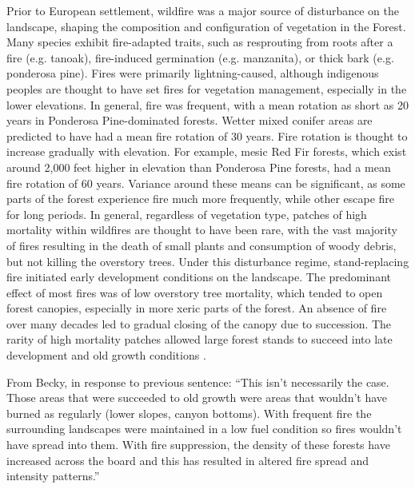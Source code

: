 Prior to European settlement, wildfire was a major source of disturbance on the landscape, shaping the composition and configuration of vegetation in the Forest. Many species exhibit fire-adapted traits, such as resprouting from roots after a fire (e.g. tanoak), fire-induced germination (e.g. manzanita), or thick bark (e.g. ponderosa pine). Fires were primarily lightning-caused, although indigenous peoples are thought to have set fires for vegetation management, especially in the lower elevations. In general, fire was frequent, with a mean rotation as short as 20 years in Ponderosa Pine-dominated forests. Wetter mixed conifer areas are predicted to have had a mean fire rotation of 30 years. Fire rotation is thought to increase gradually with elevation. For example, mesic Red Fir forests, which exist around 2,000 feet higher in elevation than Ponderosa Pine forests, had a mean fire rotation of 60 years. Variance around these means can be significant, as some parts of the forest experience fire much more frequently, while other escape fire for long periods. In general, regardless of vegetation type, patches of high mortality within wildfires are thought to have been rare, with the vast majority of fires resulting in the death of small plants and consumption of woody debris, but not killing the overstory trees. Under this disturbance regime, stand-replacing fire initiated early development conditions on the landscape. The predominant effect of most fires was of low overstory tree mortality, which tended to open forest canopies, especially in more xeric parts of the forest. An absence of fire over many decades led to gradual closing of the canopy due to succession. The rarity of high mortality patches allowed large forest stands to succeed into late development and old growth conditions \citep{SNEP1996,Mallek2013,Safford2014,SNEP1996a}.

From Becky, in response to previous sentence: ``This isn't necessarily the case.  Those areas that were succeeded to old growth were areas that wouldn't have burned as regularly (lower slopes, canyon bottoms).  With frequent fire the surrounding landscapes were maintained in a low fuel condition so fires wouldn't have spread into them.  With fire suppression, the density of these forests have increased across the board and this has resulted in altered fire spread and intensity patterns.''

